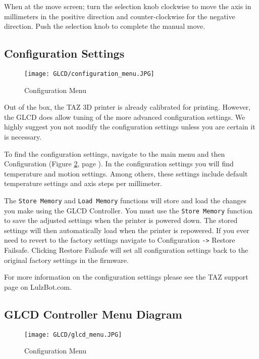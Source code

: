 When at the move screen; turn the selection knob clockwise to move the axis in millimeters in the positive direction and counter-clockwise for the negative direction. Push the selection knob to complete the manual move.

\subsection{Configuration Settings}

\begin{figure}[H]
\centering
\texttt{[image: GLCD/configuration\_menu.JPG]}
\caption{Configuration Menu}
\label{fig:configuration_menu}
\end{figure}

Out of the box, the TAZ 3D printer is already calibrated for printing. However, the GLCD does allow tuning of the more advanced configuration settings. We highly suggest you not modify the configuration settings unless you are certain it is necessary.

To find the configuration settings, navigate to the main menu and then Configuration (Figure \ref{fig:configuration_menu}, page \pageref{fig:configuration_menu}). In the configuration settings you will find temperature and motion settings. Among others, these settings include default temperature settings and axis steps per millimeter.

The \texttt{Store Memory} and \texttt{Load Memory} functions will store and load the changes you make using the GLCD Controller. You must use the \texttt{Store Memory} function to save the adjusted settings when the printer is powered down. The stored settings will then automatically load when the printer is repowered. If you ever need to revert to the factory settings navigate to Configuration \texttt{->} Restore Failsafe. Clicking Restore Failsafe will set all configuration settings back to the original factory settings in the firmware.

For more information on the configuration settings please see the TAZ support page on LulzBot.com.

\subsection{GLCD Controller Menu Diagram}
\begin{figure}[H]
\centering
\texttt{[image: GLCD/glcd\_menu.JPG]}
\caption{Configuration Menu}
\label{fig:configuration_menu}
\end{figure}




